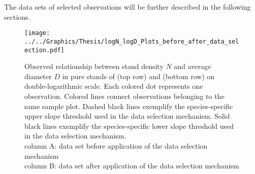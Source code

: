 The data sets of selected observations will be further described in the following sections.



\begin{figure}[H]
  \centering
  \texttt{[image: ../../Graphics/Thesis/logN\_logD\_Plots\_before\_after\_data\_selection.pdf]}
  \caption{Observed relationship between stand density \(N\) and average diameter \(D\) in pure stands of \beech{} (top row) and \spruce{} (bottom row) on double-logarithmic scale.  Each colored dot represents one observation.  Colored lines connect observations belonging to the same sample plot.  Dashed black lines exemplify the species-specific upper slope threshold used in the data selection mechanism.  Solid black lines exemplify the species-specific lower slope threshold used in the data selection mechanism.  \\
    column A: data set before application of the data selection mechanism \\
    column B: data set after application of the data selection mechanism}
  \label{fig:logN_logD_Plots_before_after_data_selection}
\end{figure}

